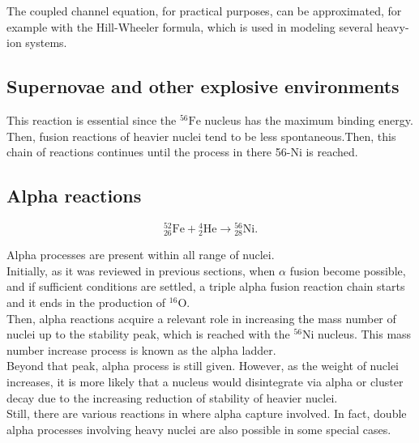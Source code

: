 \documentclass[openany]{book}
\begin{document}
The coupled channel equation, for practical purposes, can be approximated, for example with the Hill-Wheeler formula, which is used in modeling several heavy-ion systems.


\subsection{Supernovae and other explosive environments} \label{sub:explosive}

This reaction is essential since the $\mathrm{{}^{56}Fe}$ nucleus has the maximum binding energy. Then, fusion reactions of heavier nuclei tend to be less spontaneous.Then,  this chain of reactions continues until the process in there 56-Ni is reached.

\subsection{Alpha reactions} \label{sub:alphaProcesses}

\begin{equation}  \label{eq:reaction_52Fealpha}
	\mathrm{{}^{52}_{26}Fe +{}^{4}_{2}He \rightarrow {}^{56}_{28}Ni}.
\end{equation}

Alpha processes are present within all range of nuclei. \\

Initially, as it was reviewed in previous sections, when $\alpha$ fusion become possible, and if sufficient conditions are settled, a triple alpha fusion reaction chain starts and it ends in the production of $\mathrm{{}^{16}O}$.  \\

Then, alpha reactions acquire a relevant role in increasing the mass number of nuclei up to the stability peak, which is reached with the $\mathrm{{}^{56}Ni}$ nucleus. This mass number increase process is known as the alpha ladder.  \\

Beyond that peak, alpha process is still given. However, as the weight of nuclei increases, it is more likely that a nucleus would disintegrate via alpha or cluster decay  due to the increasing reduction of stability of heavier nuclei.  \\

Still, there are various reactions in where alpha capture involved. In fact, double alpha processes involving heavy nuclei are also possible in some special cases. \\
\end{document}
